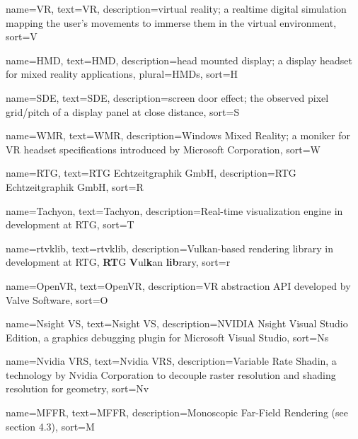 
{
  name=VR,
  text=VR,
  description={virtual reality; a realtime digital simulation mapping the user's movements to immerse them in the virtual environment}, 
  sort=V
}

{
  name=HMD,
  text=HMD,
  description={head mounted display; a display headset for mixed reality applications}, 
  plural=HMDs, 
  sort=H
}

{
  name=SDE,
  text=SDE,
  description={screen door effect; the observed pixel grid/pitch of a display panel at close distance}, 
  sort=S
}

{
  name=WMR,
  text=WMR,
  description={Windows Mixed Reality; a moniker for \gls{VR} headset specifications introduced by Microsoft Corporation}, 
  sort=W
}

{
  name=RTG,
  text=RTG Echtzeitgraphik GmbH,
  description={RTG Echtzeitgraphik GmbH}, 
  sort=R
}

{
  name=Tachyon,
  text=Tachyon,
  description={Real-time visualization engine in development at \gls{RTG}}, 
  sort=T
}

{
  name=rtvklib,
  text=rtvklib,
  description={Vulkan-based rendering library in development at \gls{RTG}, \textbf{RT}G \textbf{V}ul\textbf{k}an \textbf{lib}rary}, 
  sort=r
}

{
  name=OpenVR,
  text=OpenVR,
  description={\gls{VR} abstraction API developed by Valve Software}, 
  sort=O
}

{
  name=Nsight VS,
  text=Nsight VS,
  description={NVIDIA Nsight Visual Studio Edition, a graphics debugging plugin for Microsoft Visual Studio\cite{NvidiaCorporation.2013}}, 
  sort=Ns
}

{
  name=Nvidia VRS,
  text=Nvidia VRS,
  description={Variable Rate Shadin, a technology by Nvidia Corporation to decouple raster resolution and shading resolution for geometry\cite{NvidiaCorporation.2018}}, 
  sort=Nv
}

{
  name=MFFR,
  text=MFFR,
  description={Monoscopic Far-Field Rendering (see section 4.3)}, 
  sort=M
}











